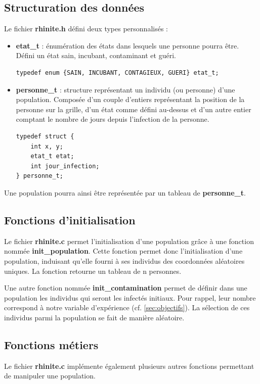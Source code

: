 \documentclass[12pt,french,titlepage]{article}
\begin{document}
\subsection{Structuration des données}
\label{sec:struct_donnees}
Le fichier \textbf{rhinite.h} défini deux types personnalisés :
\begin{itemize}
\item \textbf{etat\_t} : énumération des états dans lesquels une personne pourra être. Défini un état sain, incubant, contaminant et guéri.
\begin{lstlisting}
typedef enum {SAIN, INCUBANT, CONTAGIEUX, GUERI} etat_t;
\end{lstlisting}

\item \textbf{personne\_t} : structure représentant un individu (ou personne) d'une population. Composée d'un couple d'entiers représentant la position de la personne sur la grille, d'un état comme défini au-dessus et d'un autre entier comptant le nombre de jours depuis l'infection de la personne.
\begin{lstlisting}
typedef struct {
    int x, y;
    etat_t etat;
    int jour_infection;
} personne_t;
\end{lstlisting}
\end{itemize}

Une population pourra ainsi être représentée par un tableau de \textbf{personne\_t}. 

\subsection{Fonctions d'initialisation}
Le fichier \textbf{rhinite.c} permet l'initialisation d'une population grâce à une fonction nommée \textbf{init\_population}. Cette fonction permet donc l'initialisation d'une population, induisant qu'elle fourni à ses individus des coordonnées aléatoires uniques. La fonction retourne un tableau de n personnes.

Une autre fonction nommée \textbf{init\_contamination} permet de définir dans une population les individus qui seront les infectés initiaux. Pour rappel, leur nombre correspond à notre variable d'expérience (cf. \ref{sec:objectifs}). La sélection de ces individus parmi la population se fait de manière aléatoire.   


\subsection{Fonctions métiers}
Le fichier \textbf{rhinite.c} implémente également plusieurs autres fonctions permettant de manipuler une population.
\end{document}
